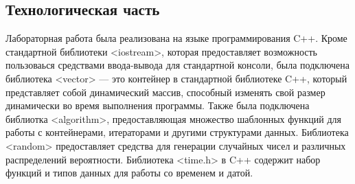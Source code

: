 \documentclass[12pt, a4paper]{article}
\begin{document}
\newpage
\begin{center}
    \section{Технологическая часть}
\end{center}

Лабораторная работа была реализована на языке программирования C++. Кроме стандартной библиотеки <iostream>, которая предоставляет возможность пользоваься средствами ввода-вывода для стандартной консоли, была подключена библиотека <vector> --- это контейнер в стандартной библиотеке C++, который представляет собой динамический массив, способный изменять свой размер динамически во время выполнения программы. Также была подключена библиотка <algorithm>, предоставляющая множество шаблонных функций для работы с контейнерами, итераторами и другими структурами данных. Библиотека <random> предоставляет средства для генерации случайных чисел и различных распределений вероятности. Библиотека <time.h> в C++ содержит набор функций и типов данных для работы со временем и датой. 
\end{document}
